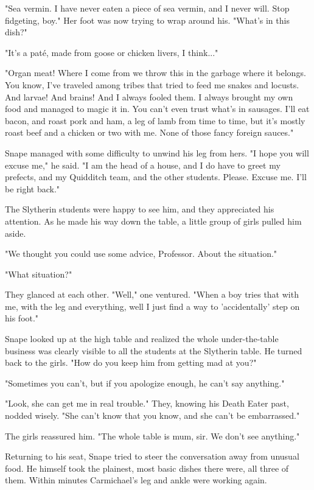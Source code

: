 \documentclass[a4paper,11pt]{article}
\begin{document}
"Sea vermin. I have never eaten a piece of sea vermin, and I never will. Stop fidgeting, boy." Her foot was now trying to wrap around his. "What's in this dish?"

"It's a paté, made from goose or chicken livers, I think..."

"Organ meat! Where I come from we throw this in the garbage where it belongs. You know, I've traveled among tribes that tried to feed me snakes and locusts. And larvae! And brains! And I always fooled them. I always brought my own food and managed to magic it in. You can't even trust what's in sausages. I'll eat bacon, and roast pork and ham, a leg of lamb from time to time, but it's mostly roast beef and a chicken or two with me. None of those fancy foreign sauces."

Snape managed with some difficulty to unwind his leg from hers. "I hope you will excuse me," he said. "I am the head of a house, and I do have to greet my prefects, and my Quidditch team, and the other students. Please. Excuse me. I'll be right back."

The Slytherin students were happy to see him, and they appreciated his attention. As he made his way down the table, a little group of girls pulled him aside.

"We thought you could use some advice, Professor. About the situation."

"What situation?"

They glanced at each other. "Well," one ventured. "When a boy tries that with me, with the leg and everything, well I just find a way to 'accidentally' step on his foot."

Snape looked up at the high table and realized the whole under-the-table business was clearly visible to all the students at the Slytherin table. He turned back to the girls. "How do you keep him from getting mad at you?"

"Sometimes you can't, but if you apologize enough, he can't say anything."

"Look, she can get me in real trouble." They, knowing his Death Eater past, nodded wisely. "She can't know that you know, and she can't be embarrassed."

The girls reassured him. "The whole table is mum, sir. We don't see anything."

Returning to his seat, Snape tried to steer the conversation away from unusual food. He himself took the plainest, most basic dishes there were, all three of them. Within minutes Carmichael's leg and ankle were working again.
\end{document}
